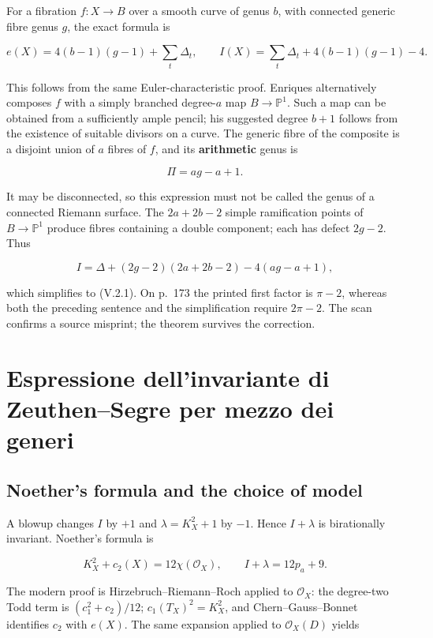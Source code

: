 For a fibration \(f:X\to B\) over a smooth curve of genus \(b\), with connected generic fibre genus \(g\), the exact formula is

\[
e(X)=4(b-1)(g-1)+\sum_t\Delta_t,
\qquad
I(X)=\sum_t\Delta_t+4(b-1)(g-1)-4. \tag{V.2.1}
\]

This follows from the same Euler-characteristic proof. Enriques alternatively composes \(f\) with a simply branched degree-\(a\) map \(B\to\mathbb P^1\). Such a map can be obtained from a sufficiently ample pencil; his suggested degree \(b+1\) follows from the existence of suitable divisors on a curve. The generic fibre of the composite is a disjoint union of \(a\) fibres of \(f\), and its \textbf{arithmetic} genus is

\[
\Pi=ag-a+1.
\]

It may be disconnected, so this expression must not be called the genus of a connected Riemann surface. The \(2a+2b-2\) simple ramification points of \(B\to\mathbb P^1\) produce fibres containing a double component; each has defect \(2g-2\). Thus

\[
I=\Delta+(2g-2)(2a+2b-2)-4(ag-a+1),
\]

which simplifies to (V.2.1). On p.~173 the printed first factor is \(\pi-2\), whereas both the preceding sentence and the simplification require \(2\pi-2\). The scan confirms a source misprint; the theorem survives the correction.

\section[Zeuthen--Segre e i generi]{Espressione dell'invariante di Zeuthen--Segre per mezzo dei generi}
\label{cp1-v-3}

\subsection{Noether's formula and the choice of model}

A blowup changes \(I\) by \(+1\) and \(\lambda=K_X^2+1\) by \(-1\). Hence \(I+\lambda\) is birationally invariant. Noether's formula is

\[
K_X^2+c_2(X)=12\chi(\mathcal O_X),
\qquad I+\lambda=12p_a+9. \tag{V.3.1}
\]

The modern proof is Hirzebruch--Riemann--Roch applied to \(\mathcal O_X\): the degree-two Todd term is \((c_1^2+c_2)/12\); \(c_1(T_X)^2=K_X^2\), and Chern--Gauss--Bonnet identifies \(c_2\) with \(e(X)\). The same expansion applied to \(\mathcal O_X(D)\) yields

